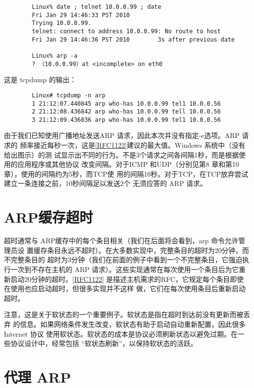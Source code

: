 \begin{verbatim}
        Linux% date ; telnet 10.0.0.99 ; date
        Fri Jan 29 14:46:33 PST 2010
        Trying 10.0.0.99.
        telnet: connect to address 10.0.0.99: No route to host
        Fri Jan 29 14:46:36 PST 2010        3s after previous date

        Linux% arp -a
        ? （10.0.0.99）at <incomplete> on eth0
\end{verbatim}
这是 tcpdump 的输出：
\begin{verbatim}
        Linux# tcpdump -n arp
        1 21:12:07.440845 arp who-has 10.0.0.99 tel1 10.0.0.56
        2 21:12:08.436842 arp who-has 10.0.0.99 tell 10.0.0.56
        3 21:12:09.436836 arp who-has 10.0.0.99 tel1 10.0.0.56
\end{verbatim}

由于我们已知使用广播地址发送ARP 请求，因此本次并没有指定-e选项。ARP 请求的
频率接近每秒一次，这是\href{https://www.rfc-editor.org/rfc/rfc1122}{[RFC1122]}建议的最大值。Windows 系统中（没有给出图示）的测
试显示出不同的行为。不是3个请求之间各间隔1秒，而是根据使用的应用程序或其他协议
改变间隔。对于ICMP 和UDP（分别见第8 章和第10章），使用的间隔约为5秒，而TCP使
用的间隔10秒。对于TCP，在TCP放弃尝试建立一条连接之前，10秒间隔足以发送2个
无须应答的 ARP 请求。

\section{ARP缓存超时}

超时通常与 ARP缓存中的每个条目相关（我们在后面将会看到，arp 命令允许管理员设
置缓存条目永远不超时）。在大多数实现中，完整条目的超时为20分钟，而不完整条目的
超时为3分钟（我们在前面的例子中看到一个不完整条目，它强迫执行一次到不存在主机的
ARP 请求）。这些实现通常在每次使用一个条目后为它重新启动20分钟的超时。\href{https://www.rfc-editor.org/rfc/rfc1122}{[RFC1122]}
是描述主机需求的RFC，它规定每个条目即使在使用也应启动超时，但很多实现并不这样
做，它们在每次使用条目后重新启动超时。

注意，这是关于软状态的一个重要例子。软状态是指在超时到达前没有更新而被丢弃
的信息。如果网络条件发生改变，软状态有助于启动自动重新配置，因此很多 Internet 协议
使用软状态。软状态的成本是协议必须刷新状态以避免过期。在一些协议设计中，经常包括
“软状态刷新”，以保持软状态的活跃。

\section{代理 ARP}


